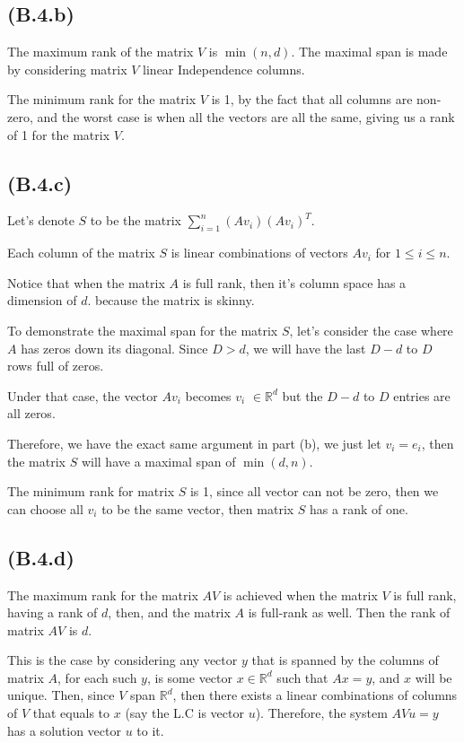 \documentclass[]{article}
\begin{document}
    \subsection*{(B.4.b)}
        \hspace{1.1em}
        The maximum rank of the matrix $V$ is $\min(n, d)$. The maximal span is made by considering matrix $V$ linear Independence columns. 
        \par
        The minimum rank for the matrix $V$ is 1, by the fact that all columns are non-zero, and the worst case is when all the vectors are all the same, giving us a rank of 1 for the matrix $V$. 
    \subsection*{(B.4.c)}
        \hspace{1.1em}
        Let's denote $S$ to be the matrix $\sum_{i = 1}^{n}(Av_i)(Av_i)^T$. 
        \par
        Each column of the matrix $S$ is linear combinations of vectors $Av_i$ for $1\le i\le n$. 
        \par
        Notice that when the matrix $A$ is full rank, then it's column space has a dimension of $d$. because the matrix is skinny. 
        \par
        To demonstrate the maximal span for the matrix $S$, let's consider the case where $A$ has zeros down its diagonal. Since $D > d$, we will have the last $D - d$ to $D$ rows full of zeros. 
        \par
        Under that case, the vector $Av_i$ becomes $v_i$ $\in\mathbb{R}^d$ but the $D - d$ to $D$ entries are all zeros. 
        \par
        Therefore, we have the exact same argument in part (b), we just let $v_i = e_i$, then the matrix $S$ will have a maximal span of $\min(d, n)$. 
        \par
        The minimum rank for matrix $S$ is 1, since all vector can not be zero, then we can choose all $v_i$ to be the same vector, then matrix $S$ has a rank of one.  
    \subsection*{(B.4.d)}
        \hspace{1.1em}
        The maximum rank for the matrix $AV$ is achieved when the matrix $V$ is full rank, having a rank of $d$, then, and the matrix $A$ is full-rank as well. Then the rank of matrix $AV$ is $d$. 
        \par
        This is the case by considering any vector $y$ that is spanned by the columns of matrix $A$, for each such $y$, is some vector $x\in \mathbb{R}^d$ such that $Ax = y$, and $x$ will be unique. Then, since $V$ span $\mathbb{R}^d$, then there exists a linear combinations of columns of $V$ that equals to $x$ (say the L.C is vector $u$). Therefore, the system $AVu = y$ has a solution vector $u$ to it. 

        
\end{document}
